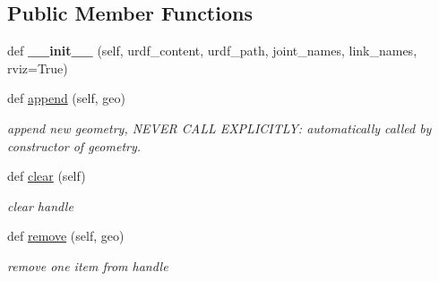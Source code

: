 \subsection*{Public Member Functions}
\begin{DoxyCompactItemize}
\item 
\mbox{\label{classrnb-planning_1_1src_1_1pkg_1_1geometry_1_1geometry_1_1_geometry_scene_aa348e6af9f351150b8a3b989eded3a13}} 
def {\bfseries \+\_\+\+\_\+init\+\_\+\+\_\+} (self, urdf\+\_\+content, urdf\+\_\+path, joint\+\_\+names, link\+\_\+names, rviz=True)
\item 
def \hyperlink{classrnb-planning_1_1src_1_1pkg_1_1geometry_1_1geometry_1_1_geometry_scene_a3539351c0e4ebd4cf3ca211870240595}{append} (self, geo)
\begin{DoxyCompactList}\small\item\em append new geometry, N\+E\+V\+ER C\+A\+LL E\+X\+P\+L\+I\+C\+I\+T\+LY\+: automatically called by constructor of geometry. \end{DoxyCompactList}\item 
\mbox{\label{classrnb-planning_1_1src_1_1pkg_1_1geometry_1_1geometry_1_1_geometry_scene_af5ba49d4d379ef8c75b66f9f6bdac4c7}} 
def \hyperlink{classrnb-planning_1_1src_1_1pkg_1_1geometry_1_1geometry_1_1_geometry_scene_af5ba49d4d379ef8c75b66f9f6bdac4c7}{clear} (self)
\begin{DoxyCompactList}\small\item\em clear handle \end{DoxyCompactList}\item 
\mbox{\label{classrnb-planning_1_1src_1_1pkg_1_1geometry_1_1geometry_1_1_geometry_scene_a198a945742f00d18a0aeca64c821d906}} 
def \hyperlink{classrnb-planning_1_1src_1_1pkg_1_1geometry_1_1geometry_1_1_geometry_scene_a198a945742f00d18a0aeca64c821d906}{remove} (self, geo)
\begin{DoxyCompactList}\small\item\em remove one item from handle \end{DoxyCompactList}\item 
\mbox{\label{classrnb-planning_1_1src_1_1pkg_1_1geometry_1_1geometry_1_1_geometry_scene_a392262f847260b217fa820f7c4f5a3e2}} 

\end{DoxyCompactItemize}
